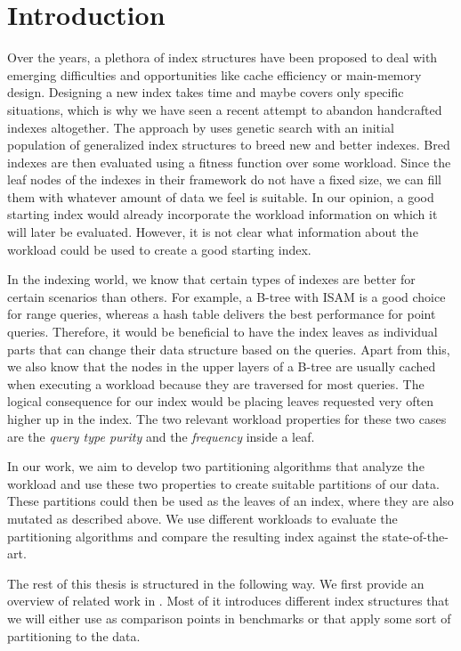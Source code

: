 \chapter{Introduction}
Over the years, a plethora of index structures have been proposed to deal with emerging difficulties and opportunities like cache efficiency or main-memory design. Designing a new index takes time and maybe covers only specific situations, which is why we have seen a recent attempt to abandon handcrafted indexes altogether. The approach by \citeauthor{Dittrich2021} \cite{Dittrich2021} uses genetic search with an initial population of generalized index structures to breed new and better indexes. Bred indexes are then evaluated using a fitness function over some workload. Since the leaf nodes of the indexes in their framework do not have a fixed size, we can fill them with whatever amount of data we feel is suitable. In our opinion, a good starting index would already incorporate the workload information on which it will later be evaluated. However, it is not clear what information about the workload could be used to create a good starting index. 

In the indexing world, we know that certain types of indexes are better for certain scenarios than others. For example, a B-tree with ISAM is a good choice for range queries, whereas a hash table delivers the best performance for point queries. Therefore, it would be beneficial to have the index leaves as individual parts that can change their data structure based on the queries. Apart from this, we also know that the nodes in the upper layers of a B-tree are usually cached when executing a workload because they are traversed for most queries. The logical consequence for our index would be placing leaves requested very often higher up in the index. The two relevant workload properties for these two cases are the \textit{query type purity} and the \textit{frequency} inside a leaf.

In our work, we aim to develop two partitioning algorithms that analyze the workload and use these two properties to create suitable partitions of our data. These partitions could then be used as the leaves of an index, where they are also mutated as described above. We use different workloads to evaluate the partitioning algorithms and compare the resulting index against the state-of-the-art. 

\clearpage
\noindent The rest of this thesis is structured in the following way. We first provide an overview of related work in . Most of it introduces different index structures that we will either use as comparison points in benchmarks or that apply some sort of partitioning to the data.

